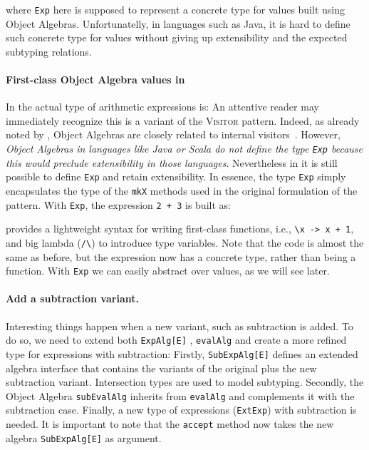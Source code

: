 \noindent where \lstinline{Exp} here is supposed to represent a
concrete type for values built using Object Algebras. Unfortunatelly, in languages
such as Java, it is hard to define such concrete type for values
without giving up extensibility and the expected subtyping  relations.

\paragraph{First-class Object Algebra values in \name}
In \name the actual type of arithmetic expressions is:
An attentive reader may immediately recognize this is a variant of the \textsc{Visitor}
pattern. Indeed, as already noted by \citet{oliveira2012extensibility}, Object
Algebras are closely related to internal visitors~\cite{Oliveira_2008}. However, \emph{Object
Algebras in languages like Java or Scala do not define the type
\lstinline{Exp} because this would preclude extensibility in those
languages}. Nevertheless in \name it is still possible to define
\lstinline{Exp} and retain extensibility. In essence, the type
\lstinline{Exp} simply encapsulates the type
of the \lstinline{mkX} methods used in the original formulation of the
pattern. With \lstinline{Exp}, the expression \lstinline{2 + 3} is
built as:


\noindent \name provides a lightweight syntax for writing first-class functions,
i.e., \lstinline{\x -> x + 1}, and big lambda (\lstinline{/\}) to introduce type
  variables. Note that the code is almost the same as before, but the expression
  now has a concrete type, rather than being a function. With \lstinline{Exp} we
  can easily abstract over values, as we will see later.


\paragraph{Add a subtraction variant.} Interesting things happen when a new
variant, such as subtraction is added. To do so, we need to extend both
\lstinline{ExpAlg[E]} , \lstinline{evalAlg} and create a more refined
type for expressions with subtraction:
Firstly, \lstinline{SubExpAlg[E]} defines an extended algebra interface that contains the
variants of the original plus the new subtraction variant. Intersection types
are used to model subtyping. Secondly, the Object Algebra
\lstinline{subEvalAlg} inherits from \lstinline{evalAlg} and
complements it with the subtraction case.
Finally, a new type of expressions
(\lstinline{ExtExp}) with subtraction is needed. It is important to note that
the \lstinline{accept} method now takes the new algebra \lstinline{SubExpAlg[E]}
as argument.

